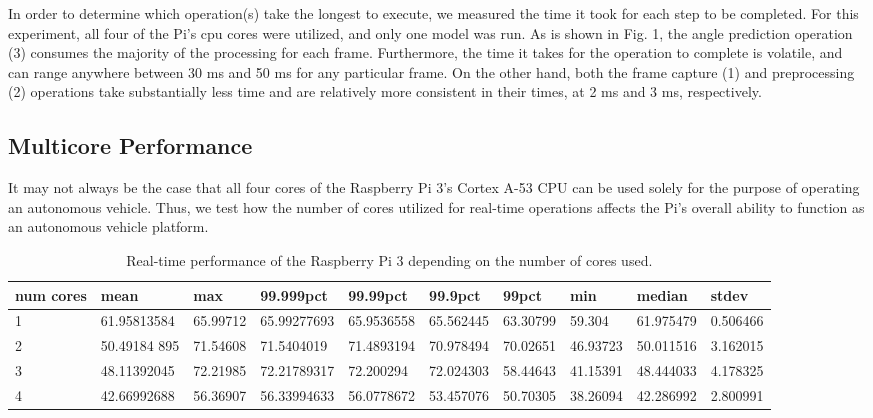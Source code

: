 \documentclass[10pt, conference]{IEEEtran}
\begin{document}
In order to determine which operation(s) take the longest to execute, we measured the time it 
took for each step to be completed. For this experiment, all four of the Pi's cpu cores were utilized, 
and only one model was run. As is shown in Fig. 1, the angle prediction operation (3) consumes the 
majority of the processing for each frame. Furthermore, the time it takes for the operation to 
complete is volatile, and can range anywhere between 30 ms and 50 ms for any particular frame. On the 
other hand, both the frame capture (1) and preprocessing (2) operations take substantially less time 
and are relatively more consistent in their times, at 2 ms and 3 ms, respectively. 

\subsection{Multicore Performance}
It may not always be the case that all four cores of the Raspberry Pi 3's Cortex A-53 CPU can be used 
solely for the purpose of operating an autonomous vehicle. Thus, we test how the number of cores 
utilized for real-time operations affects the Pi's overall ability to function as an autonomous 
vehicle platform.

\begin{table}
  \begin{tabular} {| l | l | l | l | l | l | l | l | l | l |}
    \hline
    \textbf{num cores} & \textbf{mean} & \textbf{max} & \textbf{99.999pct} & \textbf{99.99pct} & 
      \textbf{99.9pct} & \textbf{99pct} & \textbf{min} & \textbf{median} & \textbf{stdev} \\ \hline 
    1 & 61.95813584 & 65.99712 & 65.99277693 & 65.9536558 & 65.562445 & 63.30799 & 59.304 & 61.975479 & 
      0.506466 \\ \hline
    2 & 50.49184 895 & 71.54608 & 71.5404019 & 71.4893194 & 70.978494 & 70.02651 & 46.93723 & 50.011516 & 
      3.162015 \\ \hline
    3 & 48.11392045 & 72.21985 & 72.21789317 & 72.200294 & 72.024303 & 58.44643 & 41.15391 & 48.444033 & 
      4.178325 \\ \hline
    4 & 42.66992688 & 56.36907 & 56.33994633 & 56.0778672 & 53.457076 & 50.70305 & 38.26094 & 42.286992 & 
      2.800991 \\
    \hline
  \end{tabular}
  \caption{Real-time performance of the Raspberry Pi 3 depending on the number of cores used.}
\end{table}
\end{document}
